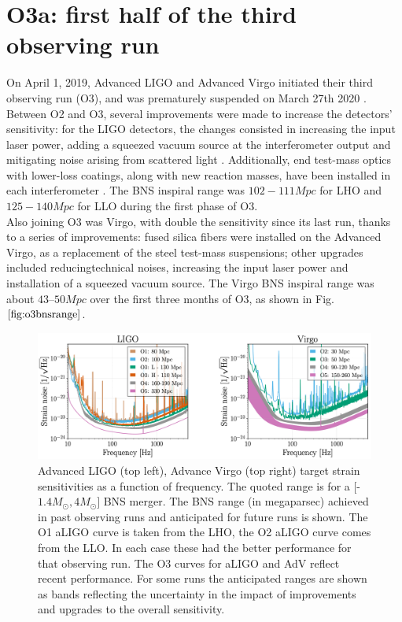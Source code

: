 \documentclass[binding=0.6cm, LaM]{sapthesis}
\begin{document}
\section{O3a: first half of the third observing run}

	On April 1, 2019, Advanced LIGO and Advanced Virgo initiated their third observing run (O3), 
	and was prematurely suspended on March 27th 2020 \cite{53}.
	Between O2 and O3, several improvements were made to increase the detectors’ sensitivity: for the LIGO detectors, 
	the changes consisted in increasing the input laser power, adding a squeezed vacuum source 
	at the interferometer output and mitigating noise arising from scattered light .  
	Additionally, end test-mass optics with lower-loss coatings, along with new reaction masses, 
	have been installed in each interferometer \cite{53}. 
	The BNS inspiral range was $102-111 Mpc$ for LHO and $125-140 Mpc$ for LLO during the first phase of O3. \\
	 Also joining O3 was Virgo, with double the sensitivity since its last run, thanks to a series of improvements: 
	fused silica fibers were installed on the Advanced Virgo, as a replacement of the steel test-mass suspensions;
	other upgrades included reducingtechnical noises, increasing the input laser power 
	and installation of a squeezed vacuum source. 
	The Virgo BNS inspiral range was about $43–50 Mpc$ over the first three months of O3, as shown in Fig.$\ref{fig:o3bnsrange}$. 
                \begin{figure}[H]
                        \label{o3bnsrange}
                        \includegraphics[scale=0.5]{o3bnsrange}
                        \centering
                        \caption{Advanced LIGO (top left), Advance Virgo (top right) target strain sensitivities as a function of frequency. The quoted range is for a [-$1.4M_\odot, 4 M_\odot]$ BNS merger. The BNS range (in megaparsec) achieved in past observing runs and anticipated for future runs is shown. The O1 aLIGO curve is taken from the LHO, the O2 aLIGO curve comes from the LLO. In each case these had the better performance for that observing run. The O3 curves for aLIGO and AdV reflect recent performance. For some runs the anticipated ranges are shown as bands reflecting the uncertainty in the impact of improvements and upgrades to the overall sensitivity. \cite{53}}
                        \label{fig:o3bnsrange}
                \end{figure}
\end{document}
